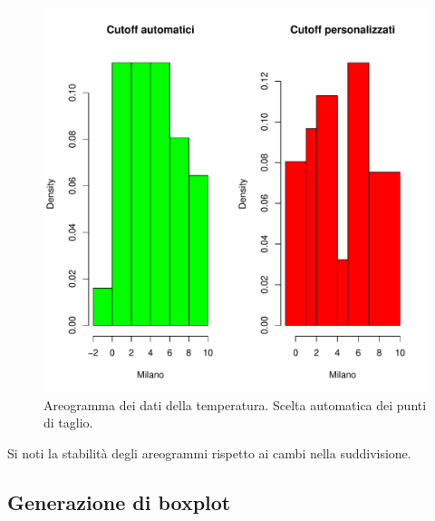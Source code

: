 \documentclass[onecolumn,12pt]{book}\usepackage[]{graphicx}\usepackage[]{color}
\makeatletter
\def\maxwidth{ %
  \ifdim\Gin@nat@width>\linewidth
    \linewidth
  \else
    \Gin@nat@width
  \fi
}
\newenvironment{knitrout}{}{} %
\makeatother
\begin{document}
\begin{figure}[htbp]
\begin{center}
\begin{knitrout}
\color{fgcolor}
\includegraphics[width=\maxwidth]{figure/unnamed-chunk-110-1} 

\end{knitrout}
\caption{ Areogramma dei dati della temperatura. Scelta automatica dei punti di taglio.}
\label{fig:datiistmilano}
\end{center}
\end{figure}
Si noti la stabilit\`a degli areogrammi rispetto ai cambi nella suddivisione.
\subsection{Generazione di boxplot}
\end{document}
